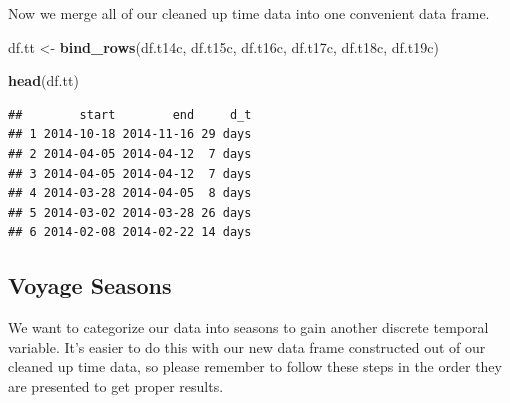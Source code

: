 \documentclass[
  11,
]{book}
\newenvironment{Shaded}{\begin{snugshade}}{\end{snugshade}}
\newcommand{\CommentTok}[1]{\textcolor[rgb]{0.37,0.37,0.37}{\textit{#1}}}
\newcommand{\FunctionTok}[1]{\textcolor[rgb]{0.27,0.27,0.27}{\textbf{#1}}}
\newcommand{\NormalTok}[1]{#1}
\newcommand{\OtherTok}[1]{\textcolor[rgb]{0.37,0.37,0.37}{#1}}
\newcommand{\SpecialCharTok}[1]{\textcolor[rgb]{0.43,0.43,0.43}{\textbf{#1}}}
\begin{document}
\begin{Shaded}
\end{Shaded}

Now we merge all of our cleaned up time data into one convenient data frame.

\begin{Shaded}
\begin{Highlighting}[]
\NormalTok{df.tt }\OtherTok{\textless{}{-}} \FunctionTok{bind\_rows}\NormalTok{(df.t14c, df.t15c, df.t16c, df.t17c, df.t18c, df.t19c)}

\FunctionTok{head}\NormalTok{(df.tt)}
\end{Highlighting}
\end{Shaded}

\begin{verbatim}
##        start        end     d_t
## 1 2014-10-18 2014-11-16 29 days
## 2 2014-04-05 2014-04-12  7 days
## 3 2014-04-05 2014-04-12  7 days
## 4 2014-03-28 2014-04-05  8 days
## 5 2014-03-02 2014-03-28 26 days
## 6 2014-02-08 2014-02-22 14 days
\end{verbatim}

\hypertarget{voyage-seasons}{%
\subsection*{Voyage Seasons}\label{voyage-seasons}}


We want to categorize our data into seasons to gain another discrete temporal variable. It's easier to do this with our new data frame constructed out of our cleaned up time data, so please remember to follow these steps in the order they are presented to get proper results.
\end{document}
